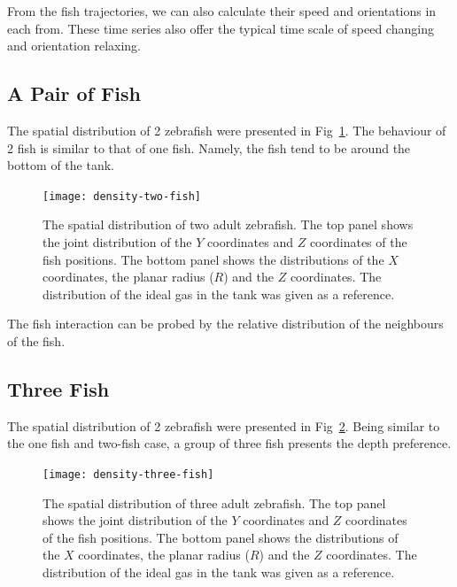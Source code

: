 \documentclass[11pt,twoside]{report}
\begin{document}
From the fish trajectories, we can also calculate their speed and orientations in each from. These time series also offer the typical time scale of speed changing and orientation relaxing.


\subsection{A Pair of Fish}
\label{section:fish_2_3d}

The spatial distribution of 2 zebrafish were presented in Fig~\ref{fig:density_3d_fish_2}. The behaviour of 2 fish is similar to that of one fish. Namely, the fish tend to be around the bottom of the tank.

\begin{figure}
  \texttt{[image: density-two-fish]}
  \caption[The 3D spatial distribution of two fish]{The spatial distribution of two adult zebrafish. The top panel shows the joint distribution of the $Y$ coordinates and $Z$ coordinates of the fish positions. The bottom panel shows the distributions of the $X$ coordinates, the planar radius ($R$) and the $Z$ coordinates. The distribution of the ideal gas in the tank was given as a reference.}
  \label{fig:density_3d_fish_2}
\end{figure}

The fish interaction can be probed by the relative distribution of the neighbours of the fish. 


\subsection{Three Fish}
\label{section:fish_3_3d}

The spatial distribution of 2 zebrafish were presented in Fig~\ref{fig:density_3d_fish_3}. Being similar to the one fish and two-fish case, a group of three fish presents the depth preference.

\begin{figure}
  \texttt{[image: density-three-fish]}
  \caption[The 3D spatial distribution of three fish]{The spatial distribution of three adult zebrafish. The top panel shows the joint distribution of the $Y$ coordinates and $Z$ coordinates of the fish positions. The bottom panel shows the distributions of the $X$ coordinates, the planar radius ($R$) and the $Z$ coordinates. The distribution of the ideal gas in the tank was given as a reference.}
  \label{fig:density_3d_fish_3}
\end{figure}
\end{document}
